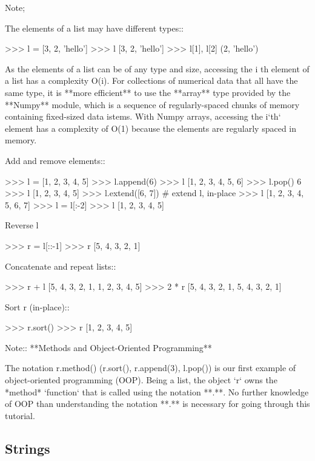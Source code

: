 \documentclass[a4paper,11pt]{extarticle}
\begin{document}
Note;

The elements of a list may have different types::
\begin{pyconcode}
>>> l = [3, 2, 'hello']
>>> l
[3, 2, 'hello']
>>> l[1], l[2]
(2, 'hello')
\end{pyconcode}

As the elements of a list can be of any type and size, accessing the
i th element of a list has a complexity O(i). For collections of
numerical data that all have the same type, it is **more efficient** to use
the **array** type provided by the **Numpy** module, which is a sequence
of regularly-spaced chunks of memory containing fixed-sized data istems.
With Numpy arrays, accessing the i`th` element has a complexity of O(1)
because the elements are regularly spaced in memory.

Add and remove elements::
\begin{pyconcode}
>>> l = [1, 2, 3, 4, 5]
>>> l.append(6)
>>> l
[1, 2, 3, 4, 5, 6]
>>> l.pop()
6
>>> l
[1, 2, 3, 4, 5]
>>> l.extend([6, 7]) # extend l, in-place
>>> l
[1, 2, 3, 4, 5, 6, 7]
>>> l = l[:-2]
>>> l
[1, 2, 3, 4, 5]
\end{pyconcode}

Reverse l
\begin{pyconcode}
>>> r = l[::-1]
>>> r
[5, 4, 3, 2, 1]
\end{pyconcode}

Concatenate and repeat lists:: 
\begin{pyconcode}
>>> r + l
[5, 4, 3, 2, 1, 1, 2, 3, 4, 5]
>>> 2 * r
[5, 4, 3, 2, 1, 5, 4, 3, 2, 1]
\end{pyconcode}

Sort r (in-place)::
\begin{pyconcode}
>>> r.sort()
>>> r
[1, 2, 3, 4, 5]
\end{pyconcode}

Note:: **Methods and Object-Oriented Programming**

The notation r.method() (r.sort(), r.append(3), l.pop()) is our
first example of object-oriented programming (OOP). Being a list, the
object `r` owns the *method* `function` that is called using the notation
**.**. No further knowledge of OOP than understanding the notation **.** is
necessary for going through this tutorial.  



\subsection{Strings}
\end{document}
